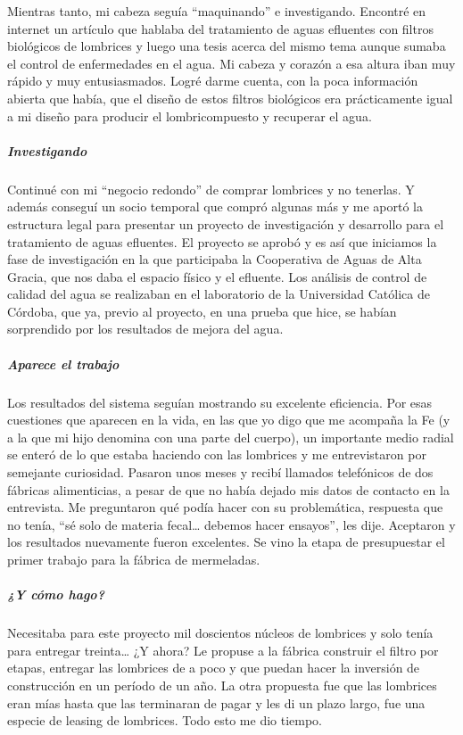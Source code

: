 \documentclass[
]{article}
\begin{document}
Mientras tanto, mi cabeza seguía ``maquinando'' e investigando. Encontré
en internet un artículo que hablaba del tratamiento de aguas efluentes
con filtros biológicos de lombrices y luego una tesis acerca del mismo
tema aunque sumaba el control de enfermedades en el agua. Mi cabeza y
corazón a esa altura iban muy rápido y muy entusiasmados. Logré darme
cuenta, con la poca información abierta que había, que el diseño de
estos filtros biológicos era prácticamente igual a mi diseño para
producir el lombricompuesto y recuperar el agua.

\hypertarget{investigando}{%
\subparagraph{Investigando}\label{investigando}}

Continué con mi ``negocio redondo'' de comprar lombrices y no tenerlas.
Y además conseguí un socio temporal que compró algunas más y me aportó
la estructura legal para presentar un proyecto de investigación y
desarrollo para el tratamiento de aguas efluentes. El proyecto se aprobó
y es así que iniciamos la fase de investigación en la que participaba la
Cooperativa de Aguas de Alta Gracia, que nos daba el espacio físico y el
efluente. Los análisis de control de calidad del agua se realizaban en
el laboratorio de la Universidad Católica de Córdoba, que ya, previo al
proyecto, en una prueba que hice, se habían sorprendido por los
resultados de mejora del agua.

\hypertarget{aparece-el-trabajo}{%
\subparagraph{Aparece el trabajo}\label{aparece-el-trabajo}}

Los resultados del sistema seguían mostrando su excelente eficiencia.
Por esas cuestiones que aparecen en la vida, en las que yo digo que me
acompaña la Fe (y a la que mi hijo denomina con una parte del cuerpo),
un importante medio radial se enteró de lo que estaba haciendo con las
lombrices y me entrevistaron por semejante curiosidad. Pasaron unos
meses y recibí llamados telefónicos de dos fábricas alimenticias, a
pesar de que no había dejado mis datos de contacto en la entrevista. Me
preguntaron qué podía hacer con su problemática, respuesta que no tenía,
``sé solo de materia fecal\ldots{} debemos hacer ensayos'', les dije.
Aceptaron y los resultados nuevamente fueron excelentes. Se vino la
etapa de presupuestar el primer trabajo para la fábrica de mermeladas.

\hypertarget{y-cuxf3mo-hago}{%
\subparagraph{¿Y cómo hago?}\label{y-cuxf3mo-hago}}

Necesitaba para este proyecto mil doscientos núcleos de lombrices y solo
tenía para entregar treinta\ldots{} ¿Y ahora? Le propuse a la fábrica
construir el filtro por etapas, entregar las lombrices de a poco y que
puedan hacer la inversión de construcción en un período de un año. La
otra propuesta fue que las lombrices eran mías hasta que las terminaran
de pagar y les di un plazo largo, fue una especie de leasing de
lombrices. Todo esto me dio tiempo.
\end{document}

